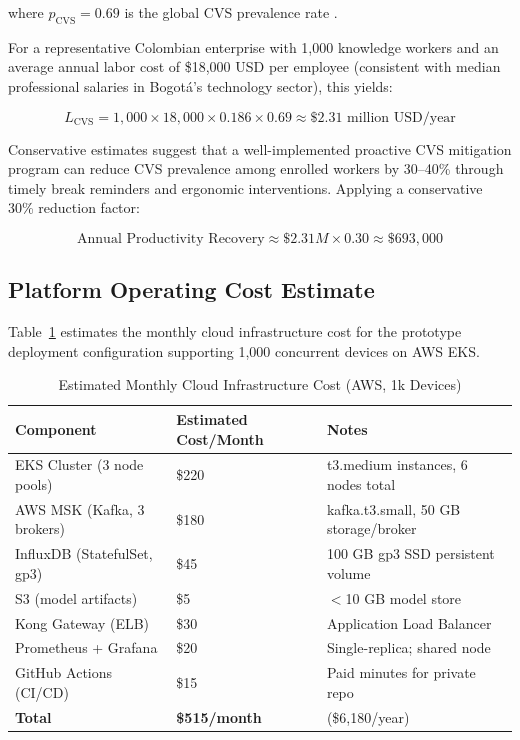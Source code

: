 \documentclass[conference]{IEEEtran}
\begin{document}
where $p_{\text{CVS}} = 0.69$ is the global CVS prevalence rate \cite{b15}.

For a representative Colombian enterprise with 1,000 knowledge workers and an average
annual labor cost of \$18,000 USD per employee (consistent with median professional
salaries in Bogotá's technology sector), this yields:

\begin{equation}
  L_{\text{CVS}} = 1{,}000 \times 18{,}000 \times 0.186 \times 0.69
  \approx \$2.31\text{ million USD/year}
  \label{eq:colombia}
\end{equation}

Conservative estimates suggest that a well-implemented proactive CVS mitigation program
can reduce CVS prevalence among enrolled workers by 30--40\% through timely break
reminders and ergonomic interventions. Applying a conservative 30\% reduction factor:

\begin{equation}
  \text{Annual Productivity Recovery} \approx \$2.31M \times 0.30 \approx \$693{,}000
  \label{eq:recovery}
\end{equation}

\subsection{Platform Operating Cost Estimate}

Table~\ref{tab:costs} estimates the monthly cloud infrastructure cost for the prototype
deployment configuration supporting 1,000 concurrent devices on AWS EKS.

\begin{table}[H]
  \centering
  \caption{Estimated Monthly Cloud Infrastructure Cost (AWS, 1k Devices)}
  \label{tab:costs}
  \begin{tabularx}{\textwidth}{p{4.5cm} p{3cm} X}
    \toprule
    \textbf{Component} & \textbf{Estimated Cost/Month} & \textbf{Notes} \\
    \midrule
    EKS Cluster (3 node pools) & \$220 & t3.medium instances, 6 nodes total \\
    AWS MSK (Kafka, 3 brokers) & \$180 & kafka.t3.small, 50 GB storage/broker \\
    InfluxDB (StatefulSet, gp3) & \$45  & 100 GB gp3 SSD persistent volume \\
    S3 (model artifacts)         & \$5   & $<$10 GB model store \\
    Kong Gateway (ELB)           & \$30  & Application Load Balancer \\
    Prometheus + Grafana          & \$20  & Single-replica; shared node \\
    GitHub Actions (CI/CD)        & \$15  & Paid minutes for private repo \\
    \midrule
    \textbf{Total}               & \textbf{\$515/month} & (\$6,180/year) \\
    \bottomrule
  \end{tabularx}
\end{table}
\end{document}
